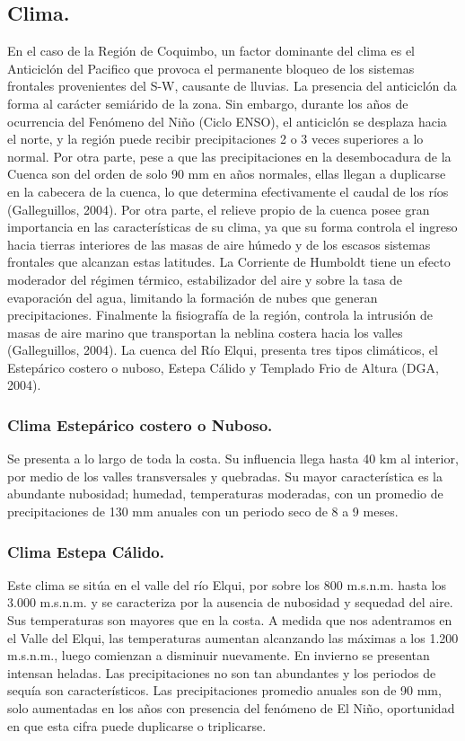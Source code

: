 \documentclass[10pt,]{article}
\begin{document}
\subsection{Clima.}
En el caso de la Región de Coquimbo, un factor dominante del clima es el Anticiclón del Pacifico que provoca el permanente bloqueo de los sistemas frontales provenientes del S-W, causante de lluvias. La presencia del anticiclón da forma al carácter semiárido de la zona. Sin embargo, durante los años de ocurrencia del Fenómeno del Niño (Ciclo ENSO), el anticiclón se desplaza hacia el norte, y la región puede recibir precipitaciones 2 o 3 veces superiores a lo normal. Por otra parte, pese a que las precipitaciones en la desembocadura de la Cuenca son del orden de solo 90 mm en años normales, ellas llegan a duplicarse en la cabecera de la cuenca, lo que determina efectivamente el caudal de los ríos (Galleguillos, 2004).
Por otra parte, el relieve propio de la cuenca posee gran importancia en las características de su clima, ya que su forma controla el ingreso hacia tierras interiores de las masas de aire húmedo y de los escasos sistemas frontales que alcanzan estas latitudes. 
La Corriente de Humboldt tiene un efecto moderador del régimen térmico, estabilizador del aire y sobre la tasa de evaporación del agua, limitando la formación de nubes que generan precipitaciones. Finalmente la fisiografía de la región, controla la intrusión de masas de aire marino que transportan la neblina costera hacia los valles (Galleguillos, 2004).
La cuenca del Río Elqui, presenta tres tipos climáticos, el Estepárico costero o nuboso, Estepa Cálido y Templado Frio de Altura (DGA, 2004).

		\subsubsection{Clima Estepárico costero o Nuboso.} 
Se presenta a lo largo de toda la costa. Su influencia llega hasta 40 km al interior, por medio de los valles transversales y quebradas. Su mayor característica es la abundante nubosidad; humedad, temperaturas moderadas, con un promedio de precipitaciones de 130 mm anuales con un periodo seco de 8 a 9 meses.

		\subsubsection{Clima Estepa Cálido.}
Este clima se sitúa en el valle del río Elqui, por sobre los 800 m.s.n.m. hasta los 3.000 m.s.n.m. y se caracteriza por la ausencia de nubosidad y sequedad del aire. Sus temperaturas son mayores que en la costa. A medida que nos adentramos en el Valle del Elqui, las temperaturas aumentan alcanzando las máximas a los 1.200 m.s.n.m., luego comienzan a disminuir nuevamente. En invierno se presentan intensan heladas. Las precipitaciones no son tan abundantes y los periodos de sequía son característicos. Las precipitaciones promedio anuales son de 90 mm, solo aumentadas en los años con presencia del fenómeno de El Niño, oportunidad en que esta cifra puede duplicarse o triplicarse.
		
\end{document}
